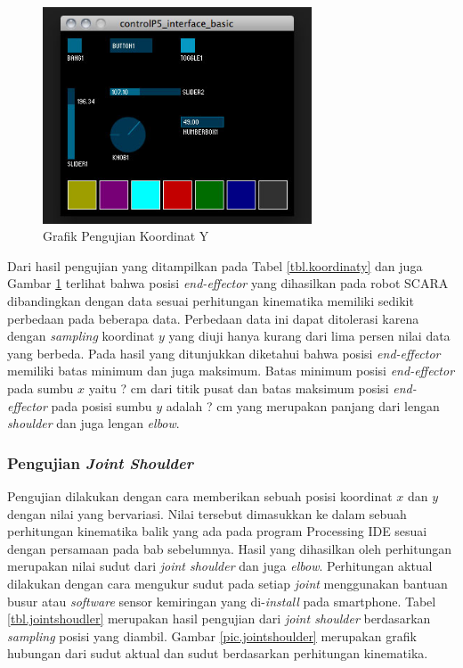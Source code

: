  \begin{figure}[H]
 	\centering
 	\includegraphics[width=8cm]{gambar/controlp5.jpg}
 	\caption{Grafik Pengujian Koordinat Y}
 	\label{pic.koordinaty}
 \end{figure}


Dari hasil pengujian yang ditampilkan pada Tabel \ref{tbl.koordinaty} dan juga Gambar \ref{pic.koordinaty} terlihat bahwa posisi \textit{end-effector} yang dihasilkan pada robot SCARA dibandingkan dengan data sesuai perhitungan kinematika memiliki sedikit perbedaan pada beberapa data. Perbedaan data ini dapat ditolerasi karena dengan \textit{sampling} koordinat $y$ yang diuji hanya kurang dari lima persen nilai data yang berbeda. Pada hasil yang ditunjukkan diketahui bahwa posisi \textit{end-effector} memiliki batas minimum dan juga maksimum. Batas minimum posisi \textit{end-effector} pada sumbu $x$ yaitu ? cm dari titik pusat dan batas maksimum posisi \textit{end-effector} pada posisi sumbu $y$ adalah ? cm yang merupakan panjang dari lengan \textit{shoulder} dan juga lengan \textit{elbow}. 

\subsubsection{Pengujian \textit{Joint Shoulder}}
Pengujian dilakukan dengan cara memberikan sebuah posisi koordinat $x$ dan $y$ dengan nilai yang bervariasi. Nilai tersebut dimasukkan ke dalam sebuah perhitungan kinematika balik yang ada pada program Processing IDE sesuai dengan persamaan pada bab sebelumnya. Hasil yang dihasilkan oleh perhitungan merupakan nilai sudut dari \textit{joint shoulder} dan juga \textit{elbow}. Perhitungan aktual dilakukan dengan cara mengukur sudut pada setiap \textit{joint} menggunakan bantuan busur atau \textit{software} sensor kemiringan yang di-\textit{install} pada smartphone. Tabel \ref{tbl.jointshoudler} merupakan hasil pengujian dari \textit{joint shoulder} berdasarkan \textit{sampling} posisi yang diambil. Gambar \ref{pic.jointshoulder} merupakan grafik hubungan dari sudut aktual dan sudut berdasarkan perhitungan kinematika. 

